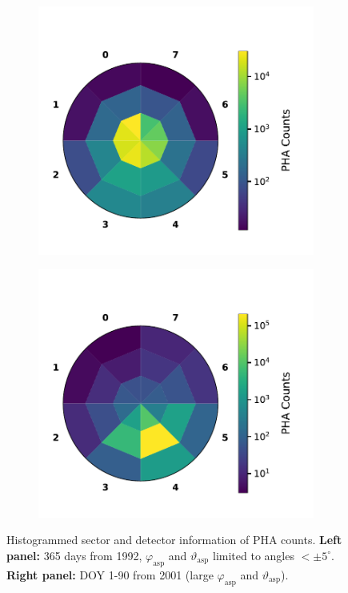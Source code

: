 \begin{figure}
	\centering
	\begin{subfigure}{.5\textwidth}
		\centering
		\includegraphics[width=1\textwidth]{Figures/hist_sec_det_noaa.pdf}
	\end{subfigure}%
	\begin{subfigure}{.5\textwidth}
		\centering
		\includegraphics[width=1\textwidth]{Figures/hist_sec_det_aa.pdf}
	\end{subfigure}
	\caption{Histogrammed sector and detector information of PHA counts. \textbf{Left panel:} 365 days from 1992, $\varphi_{\mathrm{asp}}$ and $\vartheta_{\mathrm{asp}}$ limited to angles $<\pm5^\circ$. \textbf{Right panel:} DOY 1-90 from 2001  (large $\varphi_{\mathrm{asp}}$ and $\vartheta_{\mathrm{asp}}$).}
\label{fig:histdetsecaa}
\end{figure}




